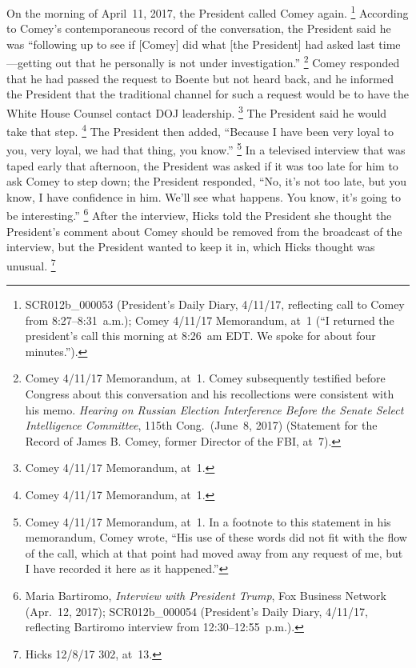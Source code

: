 On the morning of April~11, 2017, the President called Comey again.%
\footnote{SCR012b\_000053 (President's Daily Diary, 4/11/17, reflecting call to Comey from 8:27--8:31~a.m.);
Comey 4/11/17 Memorandum, at~1 (``I returned the president's call this morning at 8:26~am EDT\null.
We spoke for about four minutes.'').}
According to Comey's contemporaneous record of the conversation, the President said he was ``following up to see if [Comey] did what [the President] had asked last time---getting out that he personally is not under investigation.''%
\footnote{Comey 4/11/17 Memorandum, at~1.
Comey subsequently testified before Congress about this conversation and his recollections were consistent with his memo.
\textit{Hearing on Russian Election Interference Before the Senate Select Intelligence Committee}, 115th Cong.\ (June~8, 2017) (Statement for the Record of James B. Comey, former Director of the FBI, at~7).}
Comey responded that he had passed the request to Boente but not heard back, and he informed the President that the traditional channel for such a request would be to have the White House Counsel contact DOJ leadership.%
\footnote{Comey 4/11/17 Memorandum, at~1.}
The President said he would take that step.%
\footnote{Comey 4/11/17 Memorandum, at~1.}
The President then added, ``Because I have been very loyal to you, very loyal, we had that thing, you know.''%
\footnote{Comey 4/11/17 Memorandum, at~1.
In a footnote to this statement in his memorandum, Comey wrote, ``His use of these words did not fit with the flow of the call, which at that point had moved away from any request of me, but I have recorded it here as it happened.''}
In a televised interview that was taped early that afternoon, the President was asked if it was too late for him to ask Comey to step down;
the President responded, ``No, it's not too late, but you know, I have confidence in him.
We'll see what happens.
You know, it's going to be interesting.''%
\footnote{Maria Bartiromo, \textit{Interview with President Trump}, Fox Business Network (Apr.~12, 2017); SCR012b\_000054 (President's Daily Diary, 4/11/17, reflecting Bartiromo interview from 12:30--12:55~p.m.).}
After the interview, Hicks told the President she thought the President's comment about Comey should be removed from the broadcast of the interview, but the President wanted to keep it in, which Hicks thought was unusual.%
\footnote{Hicks 12/8/17 302, at~13.}

